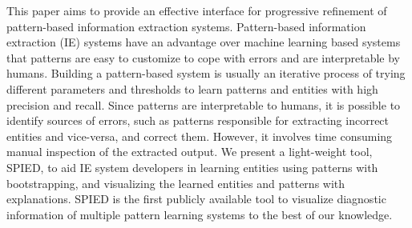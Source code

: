 This paper aims to provide an effective interface for progressive refinement of pattern-based information extraction systems. Pattern-based information extraction (IE) systems have an advantage over machine learning based systems that patterns are easy to customize to cope with errors and are interpretable by humans. Building a pattern-based system is usually an iterative process of trying different parameters and thresholds to learn patterns and entities with high precision and recall. Since patterns are interpretable to humans, it is possible to identify sources of errors, such as patterns responsible for extracting incorrect entities and vice-versa, and correct them. However, it involves time consuming manual inspection of the extracted output. We present a light-weight tool, SPIED, to aid IE system developers in learning entities using patterns with bootstrapping, and visualizing the learned entities and patterns with explanations. SPIED is the first publicly available tool to visualize diagnostic information of multiple pattern learning systems to the best of our knowledge.
